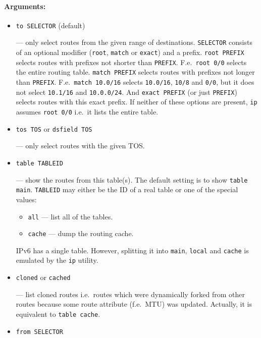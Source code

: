 \paragraph{Arguments:}
\begin{itemize}
\item \verb|to SELECTOR| (default)

--- only select routes from the given range of destinations. \verb|SELECTOR|
consists of an optional modifier (\verb|root|, \verb|match| or \verb|exact|)
and a prefix. \verb|root PREFIX| selects routes with prefixes not shorter
than \verb|PREFIX|. F.e.\ \verb|root 0/0| selects the entire routing table.
\verb|match PREFIX| selects routes with prefixes not longer than
\verb|PREFIX|. F.e.\ \verb|match 10.0/16| selects \verb|10.0/16|,
\verb|10/8| and \verb|0/0|, but it does not select \verb|10.1/16| and
\verb|10.0.0/24|. And \verb|exact PREFIX| (or just \verb|PREFIX|)
selects routes with this exact prefix. If neither of these options
are present, \verb|ip| assumes \verb|root 0/0| i.e.\ it lists the entire table.


\item \verb|tos TOS| or \verb|dsfield TOS|

 --- only select routes with the given TOS.


\item \verb|table TABLEID|

 --- show the routes from this table(s). The default setting is to show
\verb|table| \verb|main|. \verb|TABLEID| may either be the ID of a real table
or one of the special values:
  \begin{itemize}
  \item \verb|all| --- list all of the tables.
  \item \verb|cache| --- dump the routing cache.
  \end{itemize}
\begin{NB}
  IPv6 has a single table. However, splitting it into \verb|main|, \verb|local|
  and \verb|cache| is emulated by the \verb|ip| utility.
\end{NB}

\item \verb|cloned| or \verb|cached|

--- list cloned routes i.e.\ routes which were dynamically forked from
other routes because some route attribute (f.e.\ MTU) was updated.
Actually, it is equivalent to \verb|table cache|.

\item \verb|from SELECTOR|


\end{itemize}
